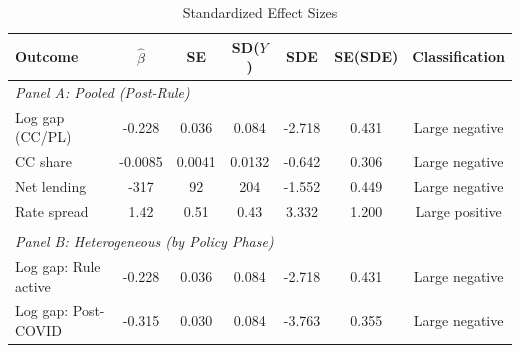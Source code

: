 \begin{table}[t]
\centering
\begin{threeparttable}
\caption{Standardized Effect Sizes}
\label{tab:sde}
\begin{tabular}{lcccccc}
\toprule
Outcome & $\hat{\beta}$ & SE & SD($Y$) & SDE & SE(SDE) & Classification \\
\midrule
\multicolumn{7}{l}{\textit{Panel A: Pooled (Post-Rule)}} \\
Log gap (CC/PL) & -0.228 & 0.036 & 0.084 & -2.718 & 0.431 & Large negative \\
CC share & -0.0085 & 0.0041 & 0.0132 & -0.642 & 0.306 & Large negative \\
Net lending & -317 & 92 & 204 & -1.552 & 0.449 & Large negative \\
Rate spread & 1.42 & 0.51 & 0.43 & 3.332 & 1.200 & Large positive \\
\\[4pt]
\multicolumn{7}{l}{\textit{Panel B: Heterogeneous (by Policy Phase)}} \\
Log gap: Rule active & -0.228 & 0.036 & 0.084 & -2.718 & 0.431 & Large negative \\
Log gap: Post-COVID & -0.315 & 0.030 & 0.084 & -3.763 & 0.355 & Large negative \\
\bottomrule
\end{tabular}
\begin{tablenotes}[flushleft]\small

\end{tablenotes}
\end{threeparttable}
\end{table}
